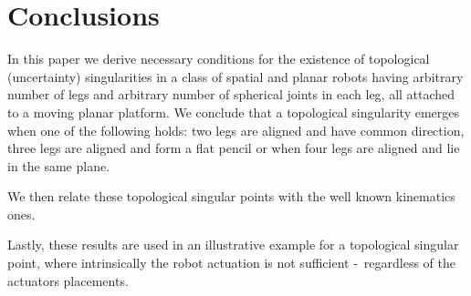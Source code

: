 
\section{Conclusions}

In this paper we derive necessary conditions for the existence of
topological (uncertainty) singularities in a class of spatial and
planar robots having arbitrary number of legs and arbitrary number
of spherical joints in each leg, all attached to a moving planar
platform. We conclude that a topological singularity emerges when
one of the following holds: two legs are aligned and have common
direction, three legs are aligned  and form a flat pencil or when
four legs are aligned and lie in the same plane.

We then relate these topological singular points with the well
known kinematics ones.

Lastly, these results are used in an illustrative example for a
topological singular point, where intrinsically the robot
actuation is not sufficient \--\ regardless of the actuators
placements.
